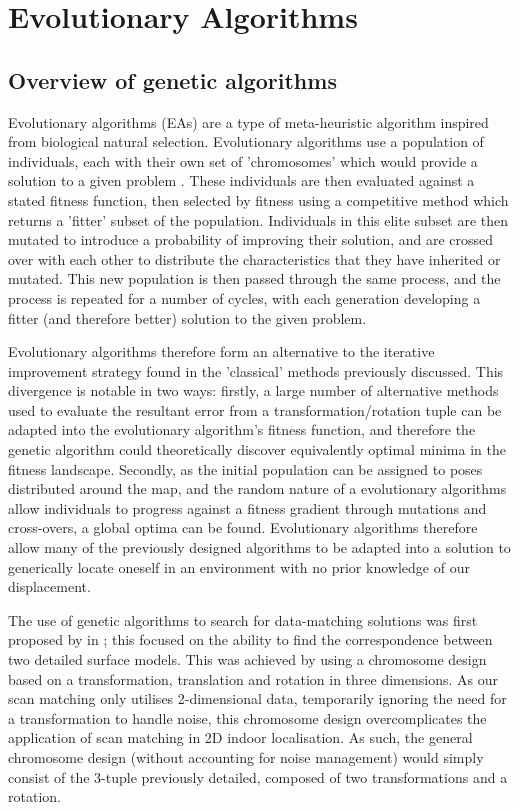 \documentclass[authoryearcitations]{UoYCSproject}
\begin{document}
\section{Evolutionary Algorithms}
\label{sec:evo_approaches}
\subsection{Overview of genetic algorithms}
Evolutionary algorithms (EAs) are a type of meta-heuristic algorithm inspired from biological natural selection. Evolutionary algorithms use a population of individuals, each with their own set of 'chromosomes' which would provide a solution to a given problem \cite{Whitley1994-tx}. These individuals are then evaluated against a stated fitness function, then selected by fitness using a competitive method which returns a 'fitter' subset of the population. Individuals in this elite subset are then mutated to introduce a probability of improving their solution, and are crossed over with each other to distribute the characteristics that they have inherited or mutated. This new population is then passed through the same process, and the process is repeated for a number of cycles, with each generation developing a fitter (and therefore better) solution to the given problem. \newline

Evolutionary algorithms therefore form an alternative to the iterative improvement strategy found in the 'classical' methods previously discussed. This divergence is notable in two ways: firstly, a large number of alternative methods used to evaluate the resultant error from a transformation/rotation tuple can be adapted into the evolutionary algorithm's fitness function, and therefore the genetic algorithm could theoretically discover equivalently optimal minima in the fitness landscape. Secondly, as the initial population can be assigned to poses distributed around the map, and the random nature of a evolutionary algorithms allow individuals to progress against a fitness gradient through mutations and cross-overs, a global optima can be found. Evolutionary algorithms therefore allow many of the previously designed algorithms to be adapted into a solution to generically locate oneself in an environment with no prior knowledge of our displacement.\newline

The use of genetic algorithms to search for data-matching solutions was first proposed by \citet{Brunnstrom1996-vo} in \citeyear{Brunnstrom1996-vo}; this focused on the ability to find the correspondence between two detailed surface models. This was achieved by using a chromosome design based on a transformation, translation and rotation in three dimensions. As our scan matching only utilises 2-dimensional data, temporarily ignoring the need for a transformation to handle noise, this chromosome design overcomplicates the application of scan matching in 2D indoor localisation. As such, the general chromosome design (without accounting for noise management) would simply consist of the 3-tuple previously detailed, composed of two transformations and a rotation.
\end{document}
